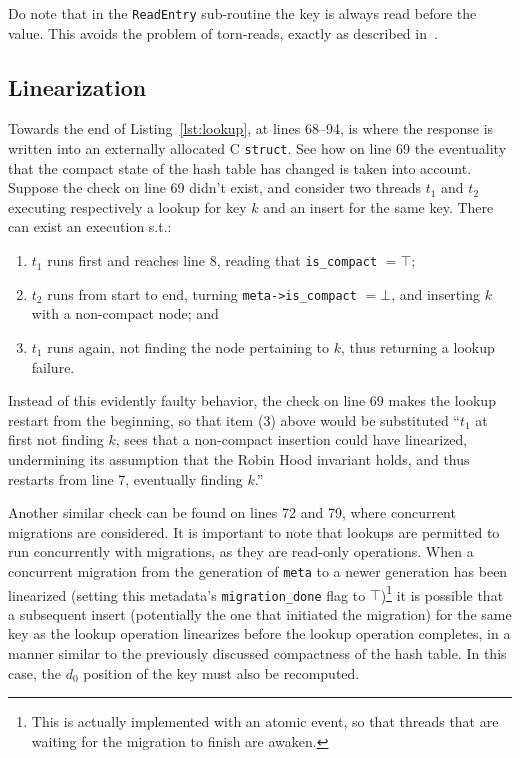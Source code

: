 Do note that in the \texttt{ReadEntry} sub-routine the key is always read before the value.
This avoids the problem of torn-reads, exactly as described in~\cite[\S4, Lookup]{maier}.



\subsection{Linearization}\label{subsec:lookup-linearization}

Towards the end of Listing~\ref{lst:lookup}, at lines 68--94, is where the response is written into an externally allocated C \texttt{struct}.
See how on line 69 the eventuality that the compact state of the hash table has changed is taken into account.
Suppose the check on line 69 didn't exist, and consider two threads $t_1$ and $t_2$ executing respectively a lookup for key $k$ and an insert for the same key.
There can exist an execution s.t.:
\begin{enumerate}
	\item $t_1$ runs first and reaches line 8, reading that \texttt{is\_compact} $= \top$;
	\item $t_2$ runs from start to end, turning \texttt{{meta->is\_compact}} $= \bot$, and inserting $k$ with a non-compact node; and
	\item $t_1$ runs again, not finding the node pertaining to $k$, thus returning a lookup failure.
\end{enumerate}

Instead of this evidently faulty behavior, the check on line 69 makes the lookup restart from the beginning, so that item (3) above would be substituted ``$t_1$ at first not finding $k$, sees that a non-compact insertion could have linearized, undermining its assumption that the Robin Hood invariant holds, and thus restarts from line 7, eventually finding $k$.''

Another similar check can be found on lines 72 and 79, where concurrent migrations are considered.
It is important to note that lookups are permitted to run concurrently with migrations, as they are read-only operations.
When a concurrent migration from the generation of \texttt{meta} to a newer generation has been linearized (setting this metadata's \texttt{{migration\_done}} flag to $\top$)\footnote{%
	This is actually implemented with an atomic event, so that threads that are waiting for the migration to finish are awaken.
} it is possible that a subsequent insert (potentially the one that initiated the migration) for the same key as the lookup operation linearizes before the lookup operation completes, in a manner similar to the previously discussed compactness of the hash table.
In this case, the $d_0$ position of the key must also be recomputed.

